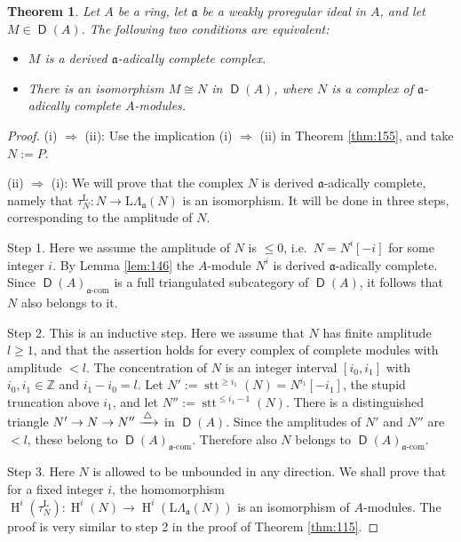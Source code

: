 \documentclass[10pt]{amsart}
\newtheorem{thm}[equation]{Theorem}
\theoremstyle{definition}
\numberwithin{equation}{section}
\newcommand{\xar}{\xrightarrow}
\newcommand{\opn}{\operatorname}
\newcommand{\cat}[1]{\operatorname{\mathsf{#1}}}
\newcommand{\rmitem}[1]{\item[\textrm{(#1)}]}
\newcommand{\mfrak}[1]{\mathfrak{#1}}
\newcommand{\mrm}[1]{\mathrm{#1}}
\newcommand{\La}{\Lambda}
\renewcommand{\a}{\mfrak{a}}
\newcommand{\Z}{\mathbb{Z}}
\newcommand{\tup}[1]{\textrm{#1}}
\newcommand{\msp}[1]{\mspace{#1 mu}}
\begin{document}
\begin{thm} \label{thm:130}
Let $A$ be a ring, let $\a$ be a weakly proregular ideal in $A$, and
let $M \in \cat{D}(A)$. The following two conditions are equivalent:
\begin{itemize}
\rmitem{i} $M$ is a derived $\a$-adically complete complex.

\rmitem{ii} There is an isomorphism $M \cong N$ in $\cat{D}(A)$,
where $N$ is a complex of $\a$-adically complete $A$-modules.
\end{itemize}
\end{thm}

\begin{proof}
(i) $\Rightarrow$ (ii): Use the implication
(i) $\Rightarrow$ (ii) in Theorem \ref{thm:155}, and take
$N := P$.

\medskip \noindent
(ii) $\Rightarrow$ (i):
We will prove that the complex $N$ is derived $\a$-adically
complete, namely that
$\tau^{\mrm{L}}_N : N \to \mrm{L} \La_{\a}(N)$ is an isomorphism.
It will be done in three steps, corresponding to the amplitude of $N$.

\medskip \noindent
Step 1. Here we assume the amplitude of $N$ is $\leq 0$, i.e.\
$N = N^i[-i]$ for some integer $i$.
By Lemma \ref{lem:146} the $A$-module $N^i$ is derived $\a$-adically
complete. Since $\cat{D}(A)_{\tup{$\a$-com}}$ is a full triangulated
subcategory of $\cat{D}(A)$, it follows that $N$ also belongs to it.

\medskip \noindent
Step 2. This is an inductive step.
Here we assume that $N$ has finite amplitude $l \geq 1$,
and that the assertion holds for every complex of complete modules
with amplitude $< l$.
The concentration of $N$ is an integer interval
$[i_0, i_1]$ with $i_0, i_1 \in \Z$ and $i_1 - i_0 = l$.
Let $N' := \opn{stt}^{\geq i_1}(N) = N^{i_1}[-i_1]$,
the stupid truncation above $i_1$, and let
$N'' := \opn{stt}^{\leq i_1 - 1}(N)$.
There is a distinguished triangle
$N' \to N \to N'' \xar{\msp{3} \triangle \msp{3}}$
in $\cat{D}(A)$.
Since the amplitudes of $N'$ and $N''$ are $< l$,
these belong to $\cat{D}(A)_{\tup{$\a$-com}}$.
Therefore also $N$ belongs to $\cat{D}(A)_{\tup{$\a$-com}}$.

\medskip \noindent
Step 3. Here $N$ is allowed to be unbounded in any direction.
We shall prove that for a fixed integer $i$, the homomorphism
$\opn{H}^i(\tau^{\mrm{L}}_N) : \opn{H}^i(N) \to \opn{H}^i(\mrm{L} \La_{\a}(N))$
is an isomorphism of $A$-modules.
The proof is very similar to step 2 in the proof of Theorem \ref{thm:115}.


\end{proof}
\end{document}
